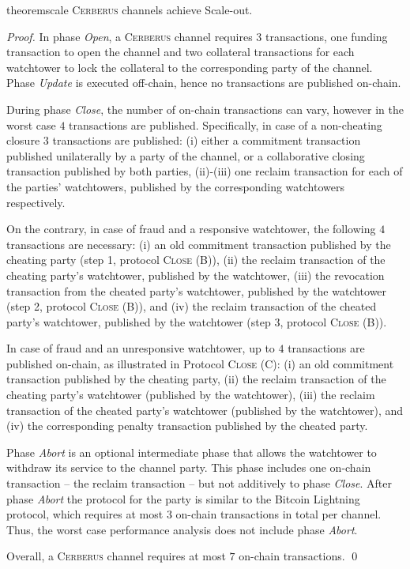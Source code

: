 \documentclass[runningheads]{llncs}
\newcommand{\sys}{\textsc{Cerberus}\xspace}
\begin{document}
\vspace{-4pt}
\begin{restatable}{theorem}{scale}
\sys channels achieve Scale-out.
\end{restatable}
\begin{proof}
In phase \textit{Open}, a \sys channel requires $3$ transactions, one funding transaction to open the channel and two collateral transactions for each watchtower to lock the collateral to the corresponding party of the channel.
Phase \textit{Update} is executed off-chain, hence no transactions are published on-chain.

During phase \textit{Close}, the number of on-chain transactions can vary, however in the worst case $4$ transactions are published.
Specifically, in case of a non-cheating closure $3$ transactions are published: (i) either a commitment transaction published unilaterally by a party of the channel, or a collaborative closing transaction published by both parties, (ii)-(iii) one reclaim transaction for each of the parties' watchtowers, published by the corresponding watchtowers respectively.

On the contrary, in case of fraud and a responsive watchtower, the following $4$ transactions are necessary: (i) an old commitment transaction published by the cheating party (step 1, protocol \textsc{Close (B)}), (ii) the reclaim transaction of the cheating party's watchtower, published by the watchtower, (iii) the revocation transaction from the cheated party's watchtower, published by the watchtower (step 2, protocol \textsc{Close (B)}), and (iv) the reclaim transaction of the cheated party's watchtower, published by the watchtower (step 3, protocol \textsc{Close (B)}).

In case of fraud and an unresponsive watchtower, up to $4$ transactions are published on-chain, as illustrated in Protocol \textsc{Close (C)}: (i) an old commitment transaction published by the cheating party, (ii) the reclaim transaction of the cheating party's watchtower (published by the watchtower), (iii) the reclaim transaction of the cheated party's watchtower (published by the watchtower), and (iv) the corresponding penalty transaction published by the cheated party.

Phase \textit{Abort} is an optional intermediate phase that allows the watchtower to withdraw its service to the channel party. This phase includes one on-chain transaction -- the reclaim transaction -- but not additively to phase \textit{Close}. After phase \textit{Abort} the protocol for the party is similar to the Bitcoin Lightning protocol, which  requires at most $3$ on-chain transactions in total per channel. Thus, the worst case performance analysis does not include phase \textit{Abort}.

Overall, a \sys channel requires at most $7$ on-chain transactions.
\hfill \qed
\end{proof}
\end{document}
